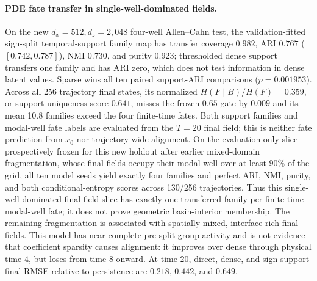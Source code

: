 \documentclass[11pt]{article}
\begin{document}
\paragraph{PDE fate transfer in single-well-dominated fields.}
On the new \(d_x=512,d_z=2{,}048\) four-well Allen--Cahn test, the validation-fitted sign-split temporal-support family map has transfer coverage \(0.982\), ARI \(0.767\) (\([0.742,0.787]\)), NMI \(0.730\), and purity \(0.923\); thresholded dense support transfers one family and has ARI zero, which does not test information in dense latent values. Sparse wins all ten paired support-ARI comparisons (\(p=0.001953\)). Across all 256 trajectory final states, its normalized \(H(F\mid B)/H(F)=0.359\), or support-uniqueness score \(0.641\), misses the frozen \(0.65\) gate by \(0.009\) and its mean 10.8 families exceed the four finite-time fates. Both support families and modal-well fate labels are evaluated from the \(T=20\) final field; this is neither fate prediction from \(x_0\) nor trajectory-wide alignment. On the evaluation-only slice prospectively frozen for this new holdout after earlier mixed-domain fragmentation, whose final fields occupy their modal well over at least \(90\%\) of the grid, all ten model seeds yield exactly four families and perfect ARI, NMI, purity, and both conditional-entropy scores across 130/256 trajectories. Thus this single-well-dominated final-field slice has exactly one transferred family per finite-time modal-well fate; it does not prove geometric basin-interior membership. The remaining fragmentation is associated with spatially mixed, interface-rich final fields. This model has near-complete pre-split group activity and is not evidence that coefficient sparsity causes alignment: it improves over dense through physical time \(4\), but loses from time \(8\) onward. At time \(20\), direct, dense, and sign-support final RMSE relative to persistence are \(0.218\), \(0.442\), and \(0.649\).
\end{document}
